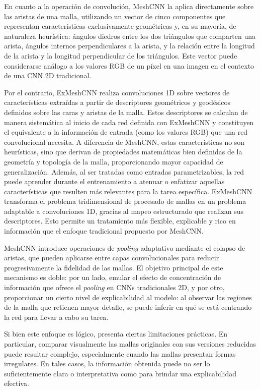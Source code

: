 En cuanto a la operación de convolución, MeshCNN la aplica directamente sobre las aristas de una malla, utilizando un vector de cinco componentes que representan características exclusivamente geométricas y, en su mayoría, de naturaleza heurística: ángulos diedros entre los dos triángulos que comparten una arista, ángulos internos perpendiculares a la arista, y la relación entre la longitud de la arista y la longitud perpendicular de los triángulos. Este vector puede considerarse análogo a los valores RGB de un píxel en una imagen en el contexto de una CNN 2D tradicional.

Por el contrario, ExMeshCNN realiza convoluciones 1D sobre vectores de características extraídas a partir de descriptores geométricos y geodésicos definidos sobre las caras y aristas de la malla. Estos descriptores se calculan de manera sistemática al inicio de cada red definida con ExMeshCNN y constituyen el equivalente a la información de entrada (como los valores RGB) que una red convolucional necesita. A diferencia de MeshCNN, estas características no son heurísticas, sino que derivan de propiedades matemáticas bien definidas de la geometría y topología de la malla, proporcionando mayor capacidad de generalización. Además, al ser tratadas como entradas parametrizables, la red puede aprender durante el entrenamiento a atenuar o enfatizar aquellas características que resulten más relevantes para la tarea específica. ExMeshCNN transforma el problema tridimensional de procesado de mallas en un problema adaptable a convoluciones 1D, gracias al mapeo estructurado que realizan sus descriptores. Esto permite un tratamiento más flexible, explicable y rico en información que el enfoque tradicional propuesto por MeshCNN.

MeshCNN introduce operaciones de \textit{pooling} adaptativo mediante el colapso de aristas, que pueden aplicarse entre capas convolucionales para reducir progresivamente la fidelidad de las mallas. El objetivo principal de este mecanismo es doble: por un lado, emular el efecto de concentración de información que ofrece el \textit{pooling} en CNNs tradicionales 2D, y por otro, proporcionar un cierto nivel de explicabilidad al modelo: al observar las regiones de la malla que retienen mayor detalle, se puede inferir en qué se está centrando la red para llevar a cabo su tarea.

Si bien este enfoque es lógico, presenta ciertas limitaciones prácticas. En particular, comparar visualmente las mallas originales con sus versiones reducidas puede resultar complejo, especialmente cuando las mallas presentan formas irregulares. En tales casos, la información obtenida puede no ser lo suficientemente clara o interpretativa como para brindar una explicabilidad efectiva.

